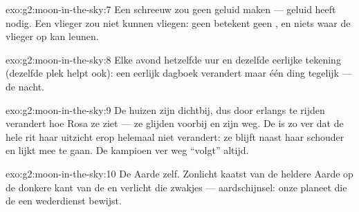 \begin{solution}{exo:g2:moon-in-the-sky:7}
Een schreeuw zou geen geluid maken --- geluid heeft  nodig. Een
vlieger zou niet kunnen vliegen: geen  betekent geen , en
niets waar de vlieger op kan leunen.
\end{solution}

\begin{solution}{exo:g2:moon-in-the-sky:8}
Elke avond hetzelfde uur en dezelfde eerlijke tekening (dezelfde plek
helpt ook): een eerlijk dagboek verandert maar één ding tegelijk ---
de nacht.
\end{solution}

\begin{solution}{exo:g2:moon-in-the-sky:9}
De huizen zijn dichtbij, dus door erlangs te rijden verandert hoe Rosa
ze ziet --- ze glijden voorbij en zijn weg. De  is zo ver dat de
hele rit haar uitzicht erop helemaal niet verandert: ze blijft naast
haar schouder en lijkt mee te gaan. De kampioen ver weg ``volgt''
altijd.
\end{solution}

\begin{solution}{exo:g2:moon-in-the-sky:10}
De Aarde zelf. Zonlicht kaatst van de heldere Aarde op de donkere kant
van de  en verlicht die zwakjes --- aardschijnsel: onze planeet
die de  een wederdienst bewijst.
\end{solution}
